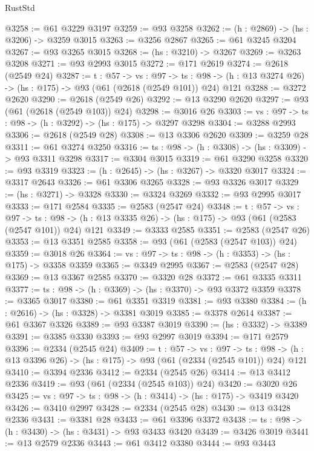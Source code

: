 \begin{lexlean}{RustStd}
\begin{coremodule}
@3258 := @61 @3229 @3197
@3259 := @93 @3258
@3262 := (h : @2869) -> (hs : @3206) -> @3259 @3015
@3263 := @3256 @2867
@3265 := @61 @3245 @3204
@3267 := @93 @3265 @3015
@3268 := (hs : @3210) -> @3267
@3269 := @3263 @3208
@3271 := @93 @2993 @3015
@3272 := @171 @2619
@3274 := @2618 (@2549 @24)
@3287 := {t : @57} ->
  {vs : @97} ->
  {ts : @98} -> (h : @13 @3274 @26) -> (hs : @175) -> @93 (@61 (@2618 (@2549 @101)) @24) @121
@3288 := @3272 @2620
@3290 := @2618 (@2549 @26)
@3292 := @13 @3290 @2620
@3297 := @93 (@61 (@2618 (@2549 @103)) @24)
@3298 := @3016 @26
@3303 := {vs : @97} -> {ts : @98} -> (h : @3292) -> (hs : @175) -> @3297 @3298
@3304 := @3288 @2993
@3306 := @2618 (@2549 @28)
@3308 := @13 @3306 @2620
@3309 := @3259 @28
@3311 := @61 @3274 @3250
@3316 := {ts : @98} -> (h : @3308) -> (hs : @3309) -> @93 @3311 @3298
@3317 := @3304 @3015
@3319 := @61 @3290 @3258
@3320 := @93 @3319
@3323 := (h : @2645) -> (hs : @3267) -> @3320 @3017
@3324 := @3317 @2643
@3326 := @61 @3306 @3265
@3328 := @93 @3326 @3017
@3329 := (hs : @3271) -> @3328
@3330 := @3324 @3269
@3332 := @93 @2995 @3017
@3333 := @171 @2584
@3335 := @2583 (@2547 @24)
@3348 := {t : @57} ->
  {vs : @97} ->
  {ts : @98} -> (h : @13 @3335 @26) -> (hs : @175) -> @93 (@61 (@2583 (@2547 @101)) @24) @121
@3349 := @3333 @2585
@3351 := @2583 (@2547 @26)
@3353 := @13 @3351 @2585
@3358 := @93 (@61 (@2583 (@2547 @103)) @24)
@3359 := @3018 @26
@3364 := {vs : @97} -> {ts : @98} -> (h : @3353) -> (hs : @175) -> @3358 @3359
@3365 := @3349 @2995
@3367 := @2583 (@2547 @28)
@3369 := @13 @3367 @2585
@3370 := @3320 @28
@3372 := @61 @3335 @3311
@3377 := {ts : @98} -> (h : @3369) -> (hs : @3370) -> @93 @3372 @3359
@3378 := @3365 @3017
@3380 := @61 @3351 @3319
@3381 := @93 @3380
@3384 := (h : @2616) -> (hs : @3328) -> @3381 @3019
@3385 := @3378 @2614
@3387 := @61 @3367 @3326
@3389 := @93 @3387 @3019
@3390 := (hs : @3332) -> @3389
@3391 := @3385 @3330
@3393 := @93 @2997 @3019
@3394 := @171 @2579
@3396 := @2334 (@2545 @24)
@3409 := {t : @57} ->
  {vs : @97} ->
  {ts : @98} -> (h : @13 @3396 @26) -> (hs : @175) -> @93 (@61 (@2334 (@2545 @101)) @24) @121
@3410 := @3394 @2336
@3412 := @2334 (@2545 @26)
@3414 := @13 @3412 @2336
@3419 := @93 (@61 (@2334 (@2545 @103)) @24)
@3420 := @3020 @26
@3425 := {vs : @97} -> {ts : @98} -> (h : @3414) -> (hs : @175) -> @3419 @3420
@3426 := @3410 @2997
@3428 := @2334 (@2545 @28)
@3430 := @13 @3428 @2336
@3431 := @3381 @28
@3433 := @61 @3396 @3372
@3438 := {ts : @98} -> (h : @3430) -> (hs : @3431) -> @93 @3433 @3420
@3439 := @3426 @3019
@3441 := @13 @2579 @2336
@3443 := @61 @3412 @3380
@3444 := @93 @3443

\end{coremodule}
\end{lexlean}
